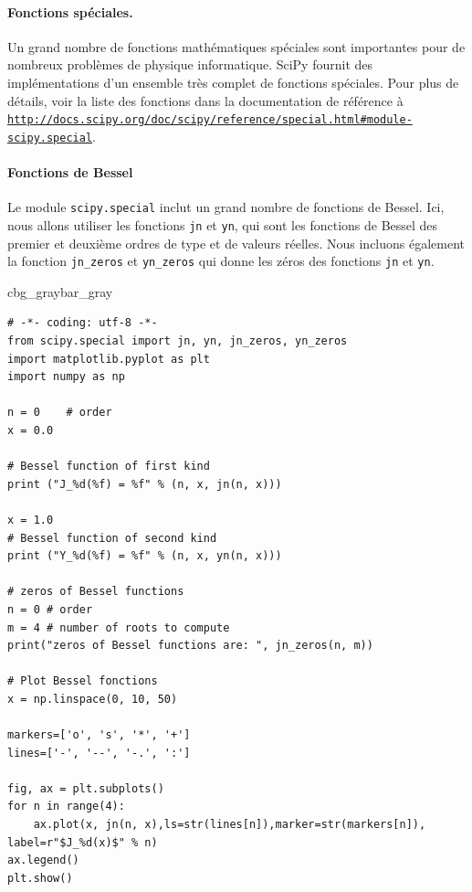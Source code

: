 \documentclass[%
oneside,                 %
final,                   %
10pt,french]{article}
\newenvironment{_pro_tight}[2]{
   \def\FrameCommand{\color{#2}\vrule width 1mm\normalcolor\colorbox{#1}}
   \FrameRule0.6pt\MakeFramed {\advance\hsize-2mm\FrameRestore}\vskip3mm}
   {\vskip0mm\endMakeFramed}
\newenvironment{pro}[2]{
\bgroup\rmfamily
\fboxsep=0mm\relax
\begin{_pro_tight}{#1}{#2}
\list{}{\parsep=-2mm\parskip=0mm\topsep=0pt\leftmargin=2mm
\rightmargin=2\leftmargin\leftmargin=4pt\relax}
\item\relax}
{\endlist\end{_pro_tight}\egroup}
\begin{document}
\paragraph{Fonctions spéciales.}
Un grand nombre de fonctions mathématiques spéciales sont importantes pour de nombreux problèmes de physique informatique. SciPy fournit des implémentations d'un ensemble très complet de fonctions spéciales. Pour plus de détails, voir la liste des fonctions dans la documentation de référence à \href{{http://docs.scipy.org/doc/scipy/reference/special.html#module-scipy.special}}{\nolinkurl{http://docs.scipy.org/doc/scipy/reference/special.html\#module-scipy.special}}.

\paragraph{Fonctions de Bessel}

Le module \texttt{scipy.special} inclut un grand nombre de fonctions de Bessel. Ici, nous allons utiliser les fonctions \texttt{jn} et \texttt{yn}, qui sont les fonctions de Bessel des premier et deuxième ordres de type et de valeurs réelles. Nous incluons également la fonction \Verb!jn_zeros! et \Verb!yn_zeros! qui donne les zéros des fonctions \texttt{jn} et \texttt{yn}.

\begin{pro}{cbg_gray}{bar_gray}\begin{verbatim}
# -*- coding: utf-8 -*-
from scipy.special import jn, yn, jn_zeros, yn_zeros
import matplotlib.pyplot as plt
import numpy as np

n = 0    # order
x = 0.0

# Bessel function of first kind
print ("J_%d(%f) = %f" % (n, x, jn(n, x)))

x = 1.0
# Bessel function of second kind
print ("Y_%d(%f) = %f" % (n, x, yn(n, x)))

# zeros of Bessel functions
n = 0 # order
m = 4 # number of roots to compute
print("zeros of Bessel functions are: ", jn_zeros(n, m))

# Plot Bessel fonctions
x = np.linspace(0, 10, 50)

markers=['o', 's', '*', '+']
lines=['-', '--', '-.', ':']

fig, ax = plt.subplots()
for n in range(4):
    ax.plot(x, jn(n, x),ls=str(lines[n]),marker=str(markers[n]), label=r"$J_%d(x)$" % n)
ax.legend()
plt.show()
\end{verbatim}
\end{pro}
\noindent
\end{document}
